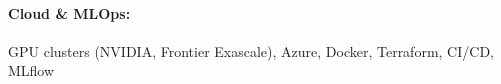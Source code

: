 \documentclass[10pt, letterpaper]{article}
\newenvironment{highlights}{
    \begin{itemize}[
        topsep=0.10 cm,
        parsep=0.10 cm,
        partopsep=0pt,
        itemsep=0pt,
        leftmargin=0 cm + 10pt
    ]
}{
    \end{itemize}
} %
\newenvironment{onecolentry}{
    \begin{adjustwidth}{
        0 cm + 0.00001 cm
    }{
        0 cm + 0.00001 cm
    }
}{
    \end{adjustwidth}
} %
\begin{document}
        \paragraph{Cloud \& MLOps:} GPU clusters (NVIDIA, Frontier Exascale), Azure, Docker, Terraform, CI/CD, MLflow

    
        



    
    
    


    
\end{document}
